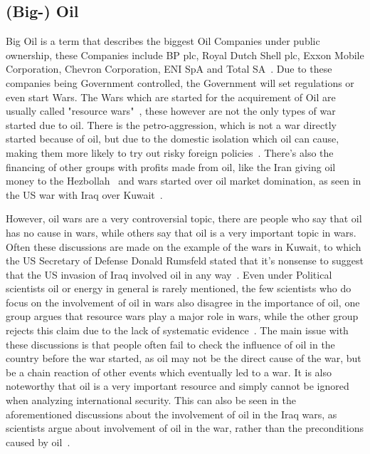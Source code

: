 \documentclass[12pt,a4paper]{article}
\begin{document}
		\subsection{(Big-) Oil}
		Big Oil is a term that describes the biggest Oil Companies under public ownership, these Companies include BP plc, Royal Dutch Shell plc, Exxon Mobile Corporation, Chevron Corporation, ENI SpA and Total SA~\cite{financial-dictionary-big-oil}. Due to these companies being Government controlled, the Government will set regulations or even start Wars. 
		The Wars which are started for the acquirement of Oil are usually called "resource wars"~\cite{belfercenter-oil-conflict}, these however are not the only types of war started due to oil. There is the petro-aggression, which is not a war directly started because of oil, but due to the domestic isolation which oil can cause, making them more likely to try out risky foreign policies~\cite{belfercenter-oil-conflict}. There's also the financing of other groups with profits made from oil, like the Iran giving oil money to the Hezbollah~\cite{ny-times-lebanon-hezbollah-fuel} and wars started over oil market domination, as seen in the US war with Iraq over Kuwait~\cite{britannica-persian-gulf-war}.
		
		However, oil wars are a very controversial topic, there are people who say that oil has no cause in wars, while others say that oil is a very important topic in wars. Often these discussions are made on the example of the wars in Kuwait, to which the US Secretary of Defense Donald Rumsfeld stated that it's nonsense to suggest that the US invasion of Iraq involved oil in any way~\cite{stokes_blood_for_oil}. Even under Political scientists oil or energy in general is rarely mentioned, the few scientists who do focus on the involvement of oil in wars also disagree in the importance of oil, one group argues that resource wars play a major role in wars, while the other group rejects this claim due to the lack of systematic evidence~\cite{fueling-fire-jeff-d}. The main issue with these discussions is that people often fail to check the influence of oil in the country before the war started, as oil may not be the direct cause of the war, but be a chain reaction of other events which eventually led to a war. It is also noteworthy that oil is a very important resource and simply cannot be ignored when analyzing international security. This can also be seen in the aforementioned discussions about the involvement of oil in the Iraq wars, as scientists argue about involvement of oil in the war, rather than the preconditions caused by oil~\cite{fueling-fire-jeff-d}.
\end{document}
